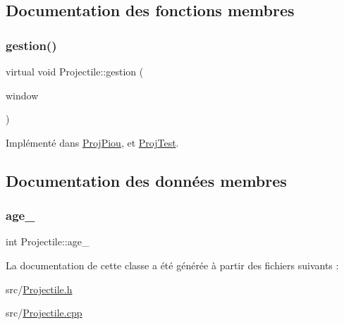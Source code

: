 \subsection{Documentation des fonctions membres}
\mbox{\label{class_projectile_aa969857f9837d9be3a6ea415c9ba3ff1}} 
\subsubsection{\texorpdfstring{gestion()}{gestion()}}
{\footnotesize\ttfamily virtual void Projectile\+::gestion (\begin{DoxyParamCaption}\item[{sf\+::\+Render\+Window \&}]{window }\end{DoxyParamCaption})\hspace{0.3cm}{\ttfamily [pure virtual]}}



Implémenté dans \hyperlink{class_proj_piou_a964182d333ed2bf64408a7812bc4cd28}{Proj\+Piou}, et \hyperlink{class_proj_test_af0b751a8e8cb0b7d10857722b691f3b6}{Proj\+Test}.



\subsection{Documentation des données membres}
\mbox{\label{class_projectile_a1f0a231e002d4796c32ccfeb36c887b1}} 
\subsubsection{\texorpdfstring{age\+\_\+}{age\_}}
{\footnotesize\ttfamily int Projectile\+::age\+\_\+\hspace{0.3cm}{\ttfamily [protected]}}



La documentation de cette classe a été générée à partir des fichiers suivants \+:\begin{DoxyCompactItemize}
\item 
src/\hyperlink{_projectile_8h}{Projectile.\+h}\item 
src/\hyperlink{_projectile_8cpp}{Projectile.\+cpp}\end{DoxyCompactItemize}
